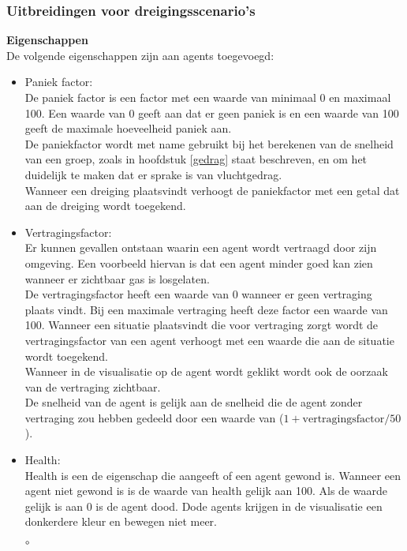 \documentclass[12pt, letterpaper]{article}
\begin{document}
\subsubsection{Uitbreidingen voor dreigingsscenario's} \label{dreig uitbr}
\textbf{Eigenschappen} \\
De volgende eigenschappen zijn aan agents toegevoegd:
\begin{itemize}
    \setlength\itemsep{1.5em}
    \item Paniek factor: \\
    De paniek factor is een factor met een waarde van minimaal 0 en maximaal 100. Een waarde van 0 geeft aan dat er geen paniek is en een waarde van 100 geeft de maximale hoeveelheid paniek aan.
    \\De paniekfactor wordt met name gebruikt bij het berekenen van de snelheid van een groep, zoals in hoofdstuk \ref{gedrag} staat beschreven, en om het duidelijk te maken dat er sprake is van vluchtgedrag. 
    \\Wanneer een dreiging plaatsvindt verhoogt de paniekfactor met een getal dat aan de dreiging wordt toegekend. 
    \item Vertragingsfactor: \\
    Er kunnen gevallen ontstaan waarin een agent wordt vertraagd door zijn omgeving. Een voorbeeld hiervan is dat een agent minder goed kan zien wanneer er zichtbaar gas is losgelaten. 
    \\ De vertragingsfactor heeft een waarde van 0 wanneer er geen vertraging plaats vindt. Bij een maximale vertraging heeft deze factor een waarde van 100. Wanneer een situatie plaatsvindt die voor vertraging zorgt wordt de vertragingsfactor van een agent verhoogt met een waarde die aan de situatie wordt toegekend.
    \\Wanneer in de visualisatie op de agent wordt geklikt wordt ook de oorzaak van de vertraging zichtbaar.
    \\De snelheid van de agent is gelijk aan de snelheid die de agent zonder vertraging zou hebben gedeeld door een waarde van ($1 + \text{vertragingsfactor}/50$).
    \item Health: \\
    Health is een de eigenschap die aangeeft of een agent gewond is. Wanneer een agent niet gewond is is de waarde van health gelijk aan 100. Als de waarde gelijk is aan 0 is de agent dood. Dode agents krijgen in de visualisatie een donkerdere kleur en bewegen niet meer. 
    \begin{list}{$\circ$}{}

\end{list}
\end{itemize}
\end{document}
